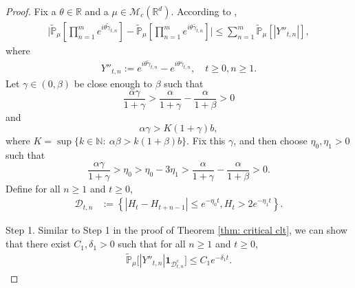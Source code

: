\documentclass[12pt,a4paper]{amsart}
\theoremstyle{plain}
\theoremstyle{definition}
\numberwithin{equation}{section}
\begin{document}
\begin{proof}
    Fix a $\theta \in \mathbb R$ and a $\mu \in \mathcal M_c(\mathbb R^d)$.
    According to \cite[Lemma 3.4.3]{Durrett2010Probability},
\begin{align}\label{ineq: used next 3}
    \Big|\tilde{\mathbb{P}}_{\mu}[\prod_{n=1}^me^{i\theta \tilde{\gamma}_{t,n}}]-\tilde{\mathbb{P}}_{\mu}[\prod_{n=1}^me^{i\theta \bar{\gamma}_{t,n}}]\Big|\leq \sum_{n=1}^m\tilde{\mathbb{P}}_{\mu}[|Y''_{t,n}|],
\end{align}
    where
\begin{align}
    Y''_{t,n}
    :=e^{i\theta\tilde{\gamma}_{t,n}}-e^{i\theta\bar{\gamma}_{t,n}},
    \quad t\geq 0, n\geq 1.
\end{align}
    Let $\gamma \in (0,\beta)$ be close enough to $\beta$ such that
\[
    \frac{\alpha \gamma}{1+\gamma}
    > \frac{\alpha}{1+\gamma} - \frac{\alpha}{1+\beta} > 0
\]
    and
\[
    \alpha\gamma
    >K(1+\gamma)b,
\]
	where $K=\sup\{k\in \mathbb N:~\alpha\beta>k(1+\beta)b\}$.
    Fix this $\gamma$, and then choose $\eta_0,\eta_1>0$ such that
\[
    \frac{\alpha \gamma}{1+\gamma}
    > \eta_0
    > \eta_0 - 3\eta_1
    > \frac{\alpha}{1+\gamma} - \frac{\alpha}{1+\beta}
    > 0.
\]
    Define for all $n \geq 1$ and $t\geq 0$,
\begin{align}
\label{def: Dtk1}
    \mathcal{D}_{t,n}
    &:=\left\{|H_t-H_{t+n-1}|\leq  e^{-\eta_0 t}, H_{t}> 2e^{-\eta_1t}\right\}.
\end{align}

    Step 1. Similar to Step 1 in the proof of Theorem \ref{thm: critical clt}, we can show that there exist $C_1,\delta_1 >0$ such that for all $n \geq 1$ and $t\geq 0$,
\begin{align}
\label{thm12111}
    \mathbb{\tilde{P}}_{\mu}\big[|Y''_{t,n}|\mathbf{1}_{\mathcal{D}^c_{t,n}}\big]
    \leq C_1 e^{-\delta_1 t}.
\end{align}



\end{proof}
\end{document}
